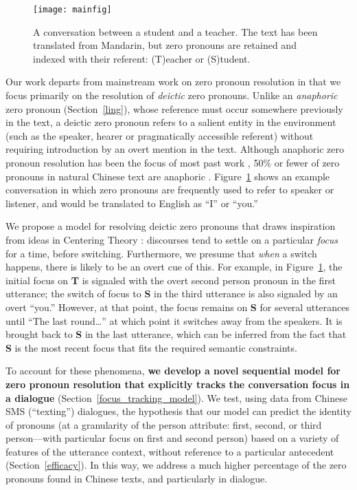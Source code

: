 \documentclass[11pt]{report}
\newcommand{\speaker}[1]{{\bf\footnotesize\textsf{#1}}}
\begin{document}
\begin{figure}[t!]\label{sms-ex}
\centering
\texttt{[image: mainfig]}
\caption{A conversation between a student and a teacher. The text has been translated from Mandarin, but zero pronouns are retained and indexed with their referent: (T)eacher or (S)tudent.}%
\end{figure}

Our work departs from mainstream work on zero pronoun resolution in that we focus primarily on the resolution of \emph{deictic} zero pronouns. Unlike an \emph{anaphoric} zero pronoun (Section~\ref{ling}), whose reference must occur somewhere previously in the text, a deictic zero pronoun refers to a salient entity in the environment (such as the speaker, hearer or pragmatically accessible referent) without requiring introduction by an overt mention in the text. Although anaphoric zero pronoun resolution has been the focus of most past work \cite{yeh2007zero,chenchinese}, 50\% or fewer of zero pronouns in natural Chinese text are anaphoric \cite{zhao2007identification,kong2010tree}. Figure~\ref{sms-ex} shows an example conversation in which zero pronouns are frequently used to refer to speaker or listener, and would be translated to English as ``I'' or ``you.''

We propose a model for resolving deictic zero pronouns that draws inspiration from ideas in Centering Theory \cite{grosz1995centering}: discourses tend to settle on a particular \emph{focus} for a time, before switching. Furthermore, we presume that \emph{when} a switch happens, there is likely to be an overt cue of this. For example, in Figure~\ref{sms-ex}, the initial focus on \speaker{T} is signaled with the overt second person pronoun in the first utterance; the switch of focus to \speaker{S} in the third utterance is also signaled by an overt ``you.'' However, at that point, the focus remains on \speaker{S} for several utterances until ``The last round\dots'' at which point it switches away from the speakers. It is brought back to \speaker{S} in the last utterance, which can be inferred from the fact that \speaker{S} is the most recent focus that fits the required semantic constraints.

To account for these phenomena, \textbf{we develop a novel sequential model for zero pronoun resolution that explicitly tracks the conversation focus in a dialogue} (Section~\ref{focus_tracking_model}). We test, using data from Chinese SMS (``texting'') dialogues, the hypothesis that our model can predict the identity of pronouns (at a granularity of the person attribute: first, second, or third person---with particular focus on first and second person) based on a variety of features of the utterance context, without reference to a particular antecedent (Section~\ref{efficacy}). In this way, we address a much higher percentage of the zero pronouns found in Chinese texts, and particularly in dialogue.
\end{document}
